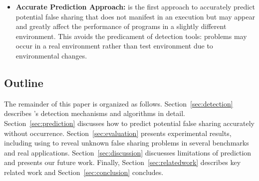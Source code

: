 \begin{itemize}
\item
\textbf{Accurate Prediction Approach:}\Predator{} is the first approach to accurately predict potential false sharing that does
not manifest in an execution but may appear and greatly affect the performance of programs 
in a slightly different environment. 
This avoids the predicament of detection tools: problems may occur in a real
environment rather than test environment due to environmental changes. 


\end{itemize}

\subsection*{Outline}

The remainder of this paper is organized as follows. 
Section~\ref{sec:detection} describes \Predator{}'s detection mechanisms and
algorithms in detail.
Section~\ref{sec:prediction} discusses how to predict potential false sharing accurately 
without occurrence. 
Section~\ref{sec:evaluation} presents experimental results, including using \Predator{} to 
reveal unknown false sharing problems in several benchmarks and real applications. 
Section~\ref{sec:discussion} discuesses limitations of prediction and presents our future work.
Finally, 
Section~\ref{sec:relatedwork} describes key related work and Section~\ref{sec:conclusion} concludes.


